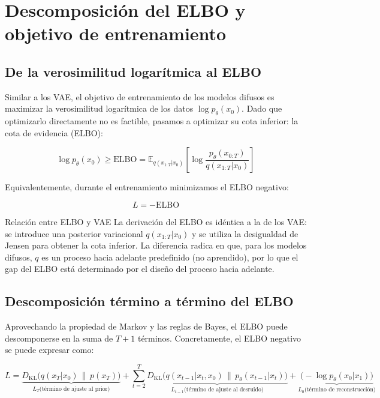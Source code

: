 \section{Descomposición del ELBO y objetivo de entrenamiento}

\subsection{De la verosimilitud logarítmica al ELBO}

Similar a los VAE, el objetivo de entrenamiento de los modelos difusos es maximizar la verosimilitud logarítmica de los datos $\log p_\theta(x_0)$. Dado que optimizarlo directamente no es factible, pasamos a optimizar su cota inferior: la cota de evidencia (ELBO):

$$\log p_\theta(x_0) \geq \text{ELBO} = \mathbb{E}_{q(x_{1:T}|x_0)}\left[\log \frac{p_\theta(x_{0:T})}{q(x_{1:T}|x_0)}\right]$$

Equivalentemente, durante el entrenamiento minimizamos el ELBO negativo:

$$L = -\text{ELBO}$$

\begin{knowledgebox}{Relación entre ELBO y VAE}
La derivación del ELBO es idéntica a la de los VAE: se introduce una posterior variacional $q(x_{1:T}|x_0)$ y se utiliza la desigualdad de Jensen para obtener la cota inferior. La diferencia radica en que, para los modelos difusos, $q$ es un proceso hacia adelante predefinido (no aprendido), por lo que el gap del ELBO está determinado por el diseño del proceso hacia adelante.
\end{knowledgebox}

\subsection{Descomposición término a término del ELBO}

Aprovechando la propiedad de Markov y las reglas de Bayes, el ELBO puede descomponerse en la suma de $T+1$ términos. Concretamente, el ELBO negativo se puede expresar como:

$$L = \underbrace{D_{\text{KL}}\big(q(x_T|x_0) \,\|\, p(x_T)\big)}_{L_T\text{(término de ajuste al prior)}} + \sum_{t=2}^{T} \underbrace{D_{\text{KL}}\big(q(x_{t-1}|x_t, x_0) \,\|\, p_\theta(x_{t-1}|x_t)\big)}_{L_{t-1}\text{(término de ajuste al desruido)}} + \underbrace{\big(-\log p_\theta(x_0|x_1)\big)}_{L_0\text{(término de reconstrucción)}}$$

